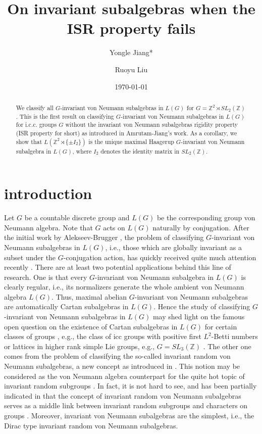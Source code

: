 \documentclass[12pt]{amsart}
\title[On invariant subalgebras when the ISR property fails]{On invariant  subalgebras when the ISR property fails}
\author{Yongle Jiang*}
\author{Ruoyu Liu}
\date{\today}
\theoremstyle{definition}
\theoremstyle{remark}
\begin{document}
\begin{abstract}
We classify all $G$-invariant von Neumann subalgebras in $L(G)$ for $G=\mathbb{Z}^2\rtimes SL_2(\mathbb{Z})$. This is the first result on classifying $G$-invariant von Neumann subalgebras in $L(G)$ for i.c.c. groups $G$ without the invariant von Neumann subalgebras rigidity property (ISR property for short) as introduced in Amrutam-Jiang's work. As a corollary, we show that $L(\mathbb{Z}^2\rtimes \{\pm I_2\})$ is the unique maximal Haagerup $G$-invariant von Neumann subalgebra in $L(G)$, where $I_2$ denotes the identity matrix in $SL_2(\mathbb{Z})$.
\end{abstract}




\maketitle




\section{introduction}

Let $G$ be a countable discrete group and $L(G)$ be the corresponding group von Neumann algebra. Note that $G$ acts on $L(G)$ naturally by conjugation.
After the initial work by Alekseev-Brugger \cite{ab}, the problem of classifying $G$-invariant von Neumann subalgebras in $L(G)$, i.e., those which are globally invariant as a subset under the $G$-conjugation action, has quickly received  quite much attention recently \cites{cd,kp,aj,cds,aho,jz}. There are at least two potential applications behind this line of research. One is that every $G$-invariant von Neumann subalgebra in $L(G)$ is clearly regular, i.e., its normalizers generate the whole ambient von Neumann algebra $L(G)$. Thus, maximal abelian $G$-invariant von Neumann subalgebras are automatically Cartan subalgebras in $L(G)$. Hence the study of classifying $G$-invariant von Neumann subalgebras in $L(G)$ may shed light on the famous open question on the existence of Cartan subalgebras in $L(G)$ for certain classes of groups \cite[Problem V]{ioana_icm}, e.g., the class of icc groups with positive first $L^2$-Betti numbers \cite[Corollary 4.4]{aj} or lattices in higher rank simple Lie groups, e.g., $G=SL_3(\mathbb{Z})$ \cite[Corollary 2.8]{kp}. The other one comes from the problem of classifying the so-called invariant random von Neumann subalgebras, a new concept as introduced in \cite{aho}. This notion may be considered as the von Neumann algebra counterpart for the quite hot topic of invariant random subgroups \cites{agv,gel}. In fact, it is 
not hard to see, and has been partially indicated in \cite{aho,jz} that the concept of invariant random von Neumann subalgebras serves as a middle link between  invariant random subgroups and characters on groups \cite{bd}. Moreover, invariant von Neumann subalgebras are the simplest, i.e., the Dirac type invariant random von Neumann subalgebras.
\end{document}
